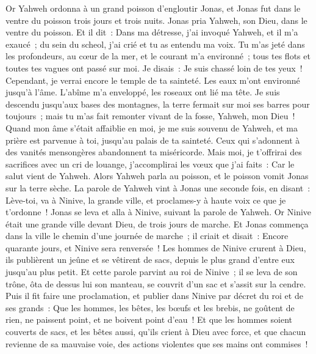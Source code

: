 \begin{multicols}{2}
\VerseOne{}Or Yahweh ordonna à un grand poisson d'engloutir Jonas, et Jonas fut dans le ventre du poisson trois jours et trois nuits.
Jonas pria Yahweh, son Dieu, dans le ventre du poisson.
Et il dit~: Dans ma détresse, j'ai invoqué Yahweh, et il m'a exaucé~; du sein du scheol, j'ai crié et tu as entendu ma voix.
Tu m'as jeté dans les profondeurs, au cœur de la mer, et le courant m'a environné~; tous tes flots et toutes tes vagues ont passé sur moi.
Je disais~: Je suis chassé loin de tes yeux~! Cependant, je verrai encore le temple de ta sainteté.
Les eaux m'ont environné jusqu'à l'âme. L'abîme m'a enveloppé, les roseaux ont lié ma tête.
Je suis descendu jusqu'aux bases des montagnes, la terre fermait sur moi ses barres pour toujours~; mais tu m'as fait remonter vivant de la fosse, Yahweh, mon Dieu~!
Quand mon âme s'était affaiblie en moi, je me suis souvenu de Yahweh, et ma prière est parvenue à toi, jusqu'au palais de ta sainteté.
Ceux qui s'adonnent à des vanités mensongères abandonnent ta miséricorde.
Mais moi, je t'offrirai des sacrifices avec un cri de louange, j'accomplirai les vœux que j'ai faits~: Car le salut vient de Yahweh.
Alors Yahweh parla au poisson, et le poisson vomit Jonas sur la terre sèche.
\VerseOne{}La parole de Yahweh vint à Jonas une seconde fois, en disant~:
Lève-toi, va à Ninive, la grande ville, et proclames-y à haute voix ce que je t'ordonne~!
Jonas se leva et alla à Ninive, suivant la parole de Yahweh. Or Ninive était une grande ville devant Dieu, de trois jours de marche.
Et Jonas commença dans la ville le chemin d'une journée de marche~; il criait et disait~: Encore quarante jours, et Ninive sera renversée~!
Les hommes de Ninive crurent à Dieu, ils publièrent un jeûne et se vêtirent de sacs, depuis le plus grand d'entre eux jusqu'au plus petit.
Et cette parole parvint au roi de Ninive~; il se leva de son trône, ôta de dessus lui son manteau, se couvrit d'un sac et s'assit sur la cendre.
Puis il fit faire une proclamation, et publier dans Ninive par décret du roi et de ses grands~: Que les hommes, les bêtes, les bœufs et les brebis, ne goûtent de rien, ne paissent point, et ne boivent point d'eau~!
Et que les hommes soient couverts de sacs, et les bêtes aussi, qu'ils crient à Dieu avec force, et que chacun revienne de sa mauvaise voie, des actions violentes que ses mains ont commises~!

\end{multicols}
